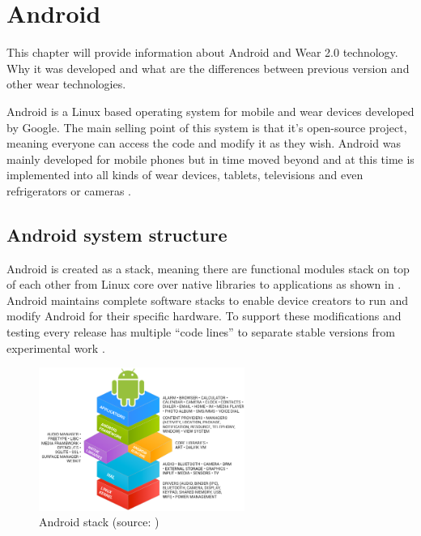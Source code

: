 \chapter{Android}\label{sec:Android}
This chapter will provide information about Android and Wear 2.0 technology. Why it was developed and what are the differences between previous version and other wear technologies.

\medskip

Android is a Linux based operating system for mobile and wear devices developed by Google. The main selling point of this system is that it's open-source project, meaning everyone can access the code and modify it as they wish. Android was mainly developed for mobile phones but in time moved beyond and at this time is implemented into all kinds of wear devices, tablets, televisions and even refrigerators or cameras \cite{WIGA}.

\section{Android system structure}\label{sec:AndroidSystemStructure}
Android is created as a stack, meaning there are functional modules stack on top of each other from Linux core over native libraries to applications as shown in . Android maintains complete software stacks to enable device creators to run and modify Android for their specific hardware. To support these modifications and testing every release has multiple \enquote{code lines} to separate stable versions from experimental work \cite{AOSP}.

\begin{figure}[H]
	\begin{centering}
		\includegraphics[width=0.6\textwidth]{img/android_stack}
		\par\end{centering}
	\caption{Android stack (source: \cite{AOSP})\label{fig:AndroidStack}}
	\label{fig6}
\end{figure}

